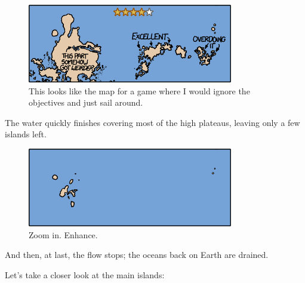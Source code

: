 {\begin{figure}[!htbp]
\centering
\includegraphics[scale=0.5, max width=0.8\textwidth]{imgs/a/54/mars_10.png}
\caption{This looks like the map for a game where I would ignore the objectives and just sail around.}
\end{figure}

{The water quickly finishes covering most of the high plateaus, leaving only a few islands left.}

\begin{figure}[!htbp]
\centering
\includegraphics[scale=0.5, max width=0.8\textwidth]{imgs/a/54/mars_11.png}
\caption{Zoom in. Enhance.}
\end{figure}

{And then, at last, the flow stops; the oceans back on Earth are drained.}

{Let's take a closer look at the main islands:}

}
